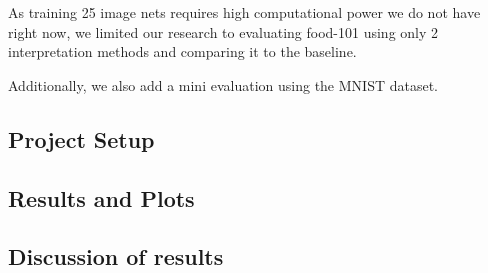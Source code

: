 As training 25 image nets requires high computational power we do not have right now, we limited our research to evaluating food-101 using only 2 interpretation methods and comparing it to the baseline.


Additionally, we also add a mini evaluation using the MNIST dataset.



\subsection{Project Setup}




\subsection{Results and Plots}

\subsection{Discussion of results}





